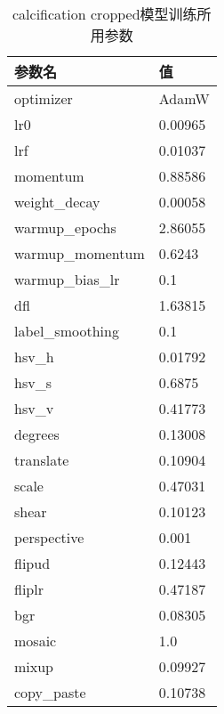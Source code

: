  \begin{table}
    \centering
  \begin{tabular}{ll}\toprule
     参数名&值\\\midrule
     optimizer&AdamW\\
     lr0&0.00965\\
     lrf&0.01037\\
     momentum&0.88586\\
     weight\_decay&0.00058\\
     warmup\_epochs&2.86055\\
     warmup\_momentum&0.6243\\
     warmup\_bias\_lr&0.1\\


     dfl&1.63815\\

   
     label\_smoothing&0.1\\
   
     hsv\_h&0.01792\\
     hsv\_s&0.6875\\
     hsv\_v&0.41773\\
     degrees&0.13008\\
     translate&0.10904\\
     scale&0.47031\\
     shear&0.10123\\
     perspective&0.001\\
     flipud&0.12443\\
     fliplr&0.47187\\
     bgr&0.08305\\
     mosaic&1.0\\
     mixup&0.09927\\
     copy\_paste&0.10738\\
     \bottomrule
    \end{tabular}
    \caption{calcification cropped模型训练所用参数}
    \end{table}
 
